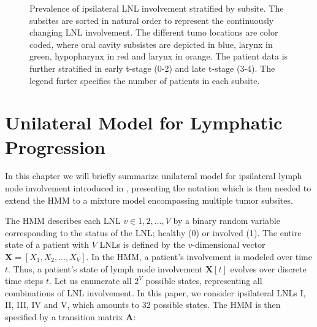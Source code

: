 \documentclass[
  sn-mathphys-num,
]{sn-jnl}
\begin{document}
\begin{figure}


\caption{\label{fig-involvement}Prevalence of ipsilateral LNL
involvement stratified by subsite. The subsites are sorted in natural
order to represent the continuously changing LNL involvement. The
different tumo locations are color coded, where oral cavity subsistes
are depicted in blue, larynx in green, hypopharynx in red and larynx in
orange. The patient data is further stratified in early t-stage (0-2)
and late t-stage (3-4). The legend furter specifies the number of
patients in each subsite.}

\end{figure}%

\section{Unilateral Model for Lymphatic
Progression}\label{sec-unilateral}

In this chapter we will briefly summarize unilateral model for
ipsilateral lymph node involvement introduced in
\citet{ludwig_hidden_2021}, presenting the notation which is then needed
to extend the HMM to a mixture model encompassing multiple tumor
subsites.

The HMM describes each LNL \(v \in 1, 2, ..., V\) by a binary random
variable corresponding to the status of the LNL; healthy (0) or involved
(1). The entire state of a patient with \(V\) LNLs is defined by the
\(v\)-dimensional vector \(\mathbf{X} = [X_1, X_2, ...,X_V]\). In the
HMM, a patient's involvement is modeled over time \(t\). Thus, a
patient's state of lymph node involvement \(\mathbf{X}[t]\) evolves over
discrete time steps \(t\). Let us enumerate all \(2^V\) possible states,
representing all combinations of LNL involvement. In this paper, we
consider ipsilateral LNLs I, II, III, IV and V, which amounts to 32
possible states. The HMM is then specified by a transition matrix
\(\mathbf{A}\):
\end{document}
